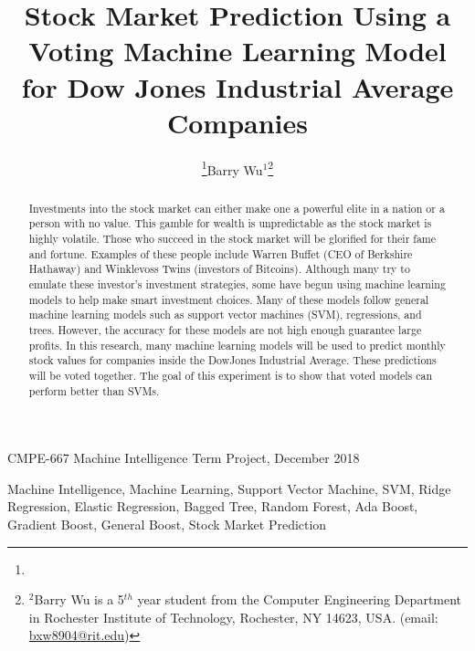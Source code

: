 \documentclass[journal]{IEEEtran}
\begin{document}
\title{Stock Market Prediction Using a Voting Machine Learning Model for Dow Jones Industrial Average Companies}

{CMPE-667 Machine Intelligence Term Project, December 2018}

\author{\thanks{\hrulefill}Barry Wu$^{1}$\thanks{$^{2}$Barry Wu is a 5$^{th}$ year student from the Computer Engineering Department in Rochester Institute of Technology, Rochester, NY 14623, USA. (email: \href{mailto:bxw8904@rit.edu}{bxw8904@rit.edu})}}

\maketitle

\begin{abstract}
Investments into the stock market can either make one a powerful elite in a nation or a person with no value. This gamble for wealth is unpredictable as the stock market is highly volatile. Those who succeed in the stock market will be glorified for their fame and fortune. Examples of these people include Warren Buffet (CEO of Berkshire Hathaway) and Winklevoss Twins (investors of Bitcoins). Although many try to emulate these investor’s investment strategies, some have begun using machine learning models to help make smart investment choices. Many of these models follow general machine learning models such as support vector machines (SVM), regressions, and trees. However, the accuracy for these models are not high enough guarantee large profits. In this research, many machine learning models will be used to predict monthly stock values for companies inside the DowJones Industrial Average. These predictions will be voted together. The goal of this experiment is to show that voted models can perform better than SVMs.
\end{abstract}

\begin{IEEEkeywords}
Machine Intelligence, Machine Learning, Support Vector Machine, SVM, Ridge Regression, Elastic Regression, Bagged Tree, Random Forest, Ada Boost, Gradient Boost, General Boost, Stock Market Prediction
\end{IEEEkeywords}

\end{document}
